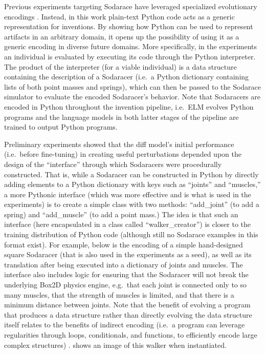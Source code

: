 \documentclass{article}
\begin{document}
Previous experiments targeting Sodarace have leveraged specialized evolutionary encodings \cite{szerlip:iesor}. Instead, in this work plain-text Python code acts as a generic representation for inventions. By showing how Python can be used to represent artifacts in an arbitrary domain, it opens up the possibility of using it as a generic encoding in diverse future domains.
More specifically, in the experiments an individual is evaluated by executing its code through the
Python interpreter. The product of the interpreter (for a viable individual) is a data structure containing the description of a Sodaracer (i.e.\ a Python dictionary containing lists of both point masses and springs), which can then be passed to the Sodarace simulator to evaluate the encoded Sodaracer's behavior. Note that Sodaracers are encoded in Python throughout the invention pipeline, i.e.\ ELM evolves Python programs and the language models in both latter stages of the pipeline are trained to output Python programs.

Preliminary experiments showed that the diff model's initial performance  (i.e.\ before fine-tuning) in creating useful perturbations depended upon the design of the ``interface'' through which Sodaracers were procedurally constructed. That is, while a Sodaracer can be constructed in Python by directly adding elements to a Python dictionary with keys such as ``joints'' and ``muscles,'' a more Pythonic interface (which was more effective and is what is used in the experiments) is to create a simple class with two methods: ``add\_joint'' (to add a spring) and ``add\_muscle'' (to add a point mass.) The idea is that such an interface (here encapsulated in a class called ``walker\_creator'') is closer to the training distribution of Python code (although still no Sodarace examples in this format exist). For example, below is the encoding of a simple hand-designed square Sodaracer (that is also used in the experiments as a seed), as well as its translation after being executed into a dictionary of joints and muscles. The interface also includes logic for ensuring that the Sodaracer will not break the underlying Box2D physics engine, e.g.\ that each joint is connected only to so many muscles, that the strength of muscles is limited, and that there is a minimum distance between joints.
Note that the benefit of evolving a program that produces a data structure rather than directly evolving the data structure itself relates to the benefits of indirect encoding (i.e.\ a program can leverage regularities through loops, conditionals, and functions, to efficiently encode large complex structures) \cite{stanley:alife03}. 
 shows an image of this walker when instantiated. 
\end{document}
